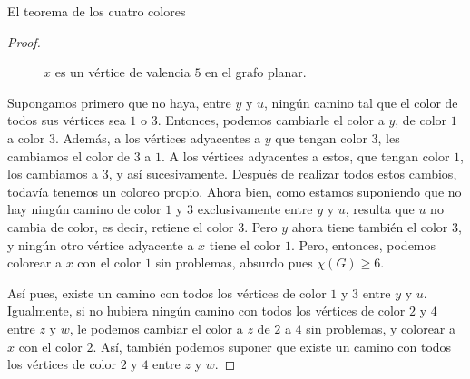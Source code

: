 \begin{section}{El teorema de los cuatro colores}
\begin{proof}
\begin{figure}[h]
    \begin{center}
\end{center}
\caption{$x$ es un vértice de valencia $5$ en el grafo planar.}\label{fA4.11}
\end{figure}

Supongamos primero que no haya, entre $y$ y $u$, ningún camino tal que el color de todos sus vértices sea $1$ o $3$. Entonces, podemos cambiarle el color a $y$, de color $1$ a color $3$. Además, a los vértices adyacentes a $y$ que tengan color $3$, les cambiamos el color de $3$ a $1$. A los vértices adyacentes a estos, que tengan color $1$, los cambiamos a $3$, y así sucesivamente. Después de realizar todos estos cambios, todavía tenemos un coloreo propio. Ahora bien, como estamos suponiendo que no hay ningún camino de
color $1$ y $3$ exclusivamente entre $y$ y $u$, resulta que $u$ no cambia de color, es decir, retiene el color $3$. Pero $y$ ahora tiene también el color $3$, y ningún otro vértice adyacente a $x$ tiene el color $1$. Pero, entonces, podemos colorear a $x$ con el color $1$ sin problemas, absurdo pues $\chi(G)\ge 6$.

Así pues, existe un camino con todos los vértices de color $1$ y $3$ entre $y$ y $u$. Igualmente, si no hubiera ningún camino con todos los vértices de color $2$ y $4$ entre $z$ y $w$, le podemos cambiar el color a $z$ de $2$ a $4$ sin problemas, y colorear a $x$ con el color $2$. Así, también podemos suponer que existe un camino con todos los vértices de color $2$ y $4$ entre $z$ y $w$. 


\end{proof}
\end{section}
